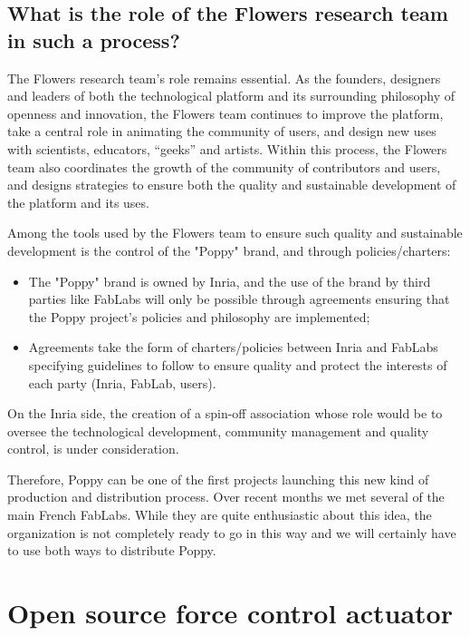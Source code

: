 \subsection{What is the role of the Flowers research team in such a process? } %

The Flowers research team's role remains essential. As the founders, designers and leaders of both the technological platform and its surrounding philosophy of openness and innovation, the Flowers team continues to improve the platform, take a central role in animating the community of users, and design new uses with scientists, educators, “geeks” and artists. Within this process, the Flowers team also coordinates the growth of the community of contributors and users, and designs strategies to ensure both the quality and sustainable development of the platform and its uses.

Among the tools used by the Flowers team to ensure such quality and sustainable development is the control of the "Poppy" brand, and through policies/charters:

\begin{itemize}
\item The "Poppy" brand is owned by Inria, and the use of the brand by third parties like FabLabs will only be possible through agreements ensuring that the Poppy project’s policies and philosophy are implemented;
\item Agreements take the form of charters/policies between Inria and FabLabs specifying guidelines to follow to ensure quality and protect the interests of each party (Inria, FabLab, users).
\end{itemize}

On the Inria side, the creation of a spin-off association whose role would be to  oversee the technological development, community management and quality control, is under consideration.



Therefore, Poppy can be one of the first projects launching this new kind of production and distribution process. Over recent months we met several of the main French FabLabs. While they are quite enthusiastic about this idea, the organization is not completely ready to go in this way and we will certainly have to use both ways to distribute Poppy.





\section{Open source force control actuator} %
\label{sec:open_sourcing_the_robotic_actuations}


